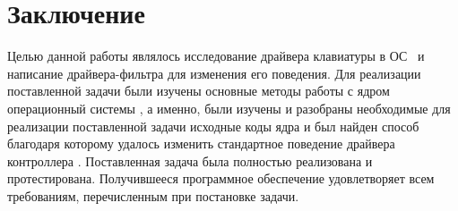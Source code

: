 \section*{Заключение}
Целью данной работы являлось исследование драйвера клавиатуры в ОС \linux\ и
написание драйвера-фильтра для изменения его поведения. Для реализации
поставленной задачи были изучены основные методы работы с ядром операционный
системы \gnulinux, а именно, были изучены и разобраны необходимые для
реализации поставленной задачи исходные коды ядра и был найден способ
благодаря которому удалось изменить стандартное поведение драйвера контроллера 
.
\newpar
Поставленная задача была полностью реализована и протестирована.
Получившееся программное обеспечение удовлетворяет всем требованиям,
перечисленным при постановке задачи.
\newpage
